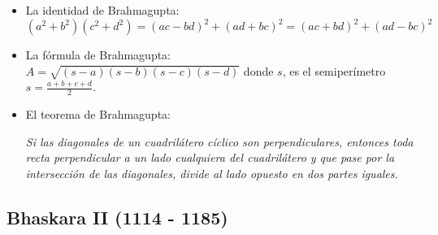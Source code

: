 \documentclass[12pt, aspectratio=169]{beamer} %
\begin{document}
		\begin{frame}
			\begin{itemize}
				\item La identidad de Brahmagupta:
				$$ (a^2 + b^2)(c^2 + d^2) =(ac - bd)^2 + (ad + bc)^2 = (ac + bd)^2 + (ad-bc)^2$$
				\item La fórmula de Brahmagupta: \\
				$\displaystyle A = \sqrt{(s - a)(s - b)(s - c)(s - d)}$ donde $s$, es el semiperímetro $\displaystyle
				s = \frac {a + b + c + d}{2}$. 
				\item El teorema de Brahmagupta:
				\begin{center}
					\em Si las diagonales de un cuadrilátero cíclico son perpendiculares, entonces toda recta perpendicular
					a un lado cualquiera del cuadrilátero y que pase por la intersección de las diagonales, divide al lado
					opuesto en dos partes iguales.
				\end{center}
			\end{itemize}
		\end{frame}

	\subsection{Bhaskara II (1114 - 1185)}
		\begin{frame}
		\end{frame}
		
\end{document}
